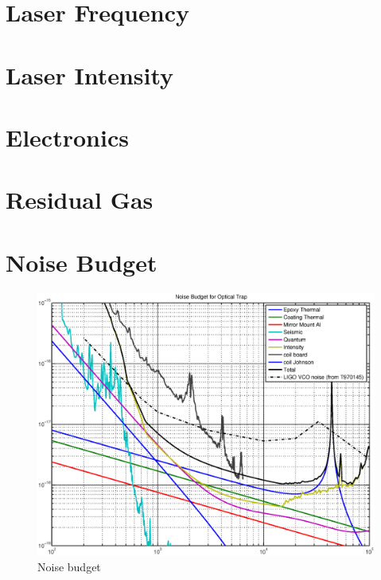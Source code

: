 
\section{Laser Frequency}

\section{Laser Intensity}

\section{Electronics}

\section{Residual Gas}

\section{Noise Budget}

\begin{figure}[htbp]
	\centering
		\includegraphics[width=15cm]{./figures/noise_budget.eps}
	\caption[Noise Budget]{Noise budget}
	\label{fig:noise_bud}
\end{figure}

